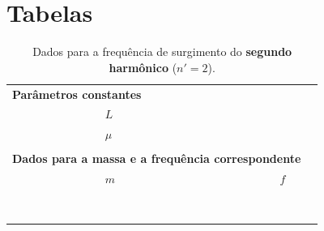\clearpage
\section{Tabelas}

\begin{table}[!htb]
\caption{Dados para a frequência de surgimento do \textbf{segundo harmônico} ($n' = 2$).}
\label{Tab:FrequenciaFuncaoMassa}
	\begin{center}
		\begin{tabular}{cp{45mm}p{45mm}c}
		\toprule
\multicolumn{2}{l}{\textbf{Parâmetros constantes}}&&\\
		\cmidrule{2-3}
		& \cellcolor[gray]{0.89}$L$ &\cellcolor[gray]{0.92} \\
		& \cellcolor[gray]{0.95}$\mu$ & \cellcolor[gray]{0.97}\\
		\cmidrule{2-3}
		\\
\multicolumn{3}{l}{\textbf{Dados para a massa e a frequência correspondente}} \\
		\cmidrule{2-3}		
		& $m$ & $f$ \\
		\cmidrule{2-3}
		& \cellcolor[gray]{0.89} & \cellcolor[gray]{0.92} \\
		& \cellcolor[gray]{0.95} & \cellcolor[gray]{0.97} \\
		& \cellcolor[gray]{0.89} & \cellcolor[gray]{0.92} \\
		& \cellcolor[gray]{0.95} & \cellcolor[gray]{0.97} \\
		& \cellcolor[gray]{0.89} & \cellcolor[gray]{0.92} \\
		& \cellcolor[gray]{0.95} & \cellcolor[gray]{0.97} \\
		& \cellcolor[gray]{0.89} & \cellcolor[gray]{0.92} \\
		& \cellcolor[gray]{0.95} & \cellcolor[gray]{0.97} \\
		\cmidrule{2-3}		
		\bottomrule
		\end{tabular}
	\end{center}
\end{table}

